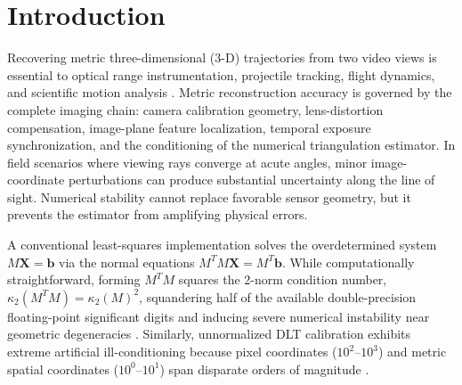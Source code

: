 \documentclass[a4paper,conference]{IEEEtran}
\newcommand{\X}{\mathbf{X}}
\begin{document}
\section{Introduction}
Recovering metric three-dimensional (3-D) trajectories from two video views is essential to optical range instrumentation, projectile tracking, flight dynamics, and scientific motion analysis \cite{hz,abdkarara}. Metric reconstruction accuracy is governed by the complete imaging chain: camera calibration geometry, lens-distortion compensation, image-plane feature localization, temporal exposure synchronization, and the conditioning of the numerical triangulation estimator. In field scenarios where viewing rays converge at acute angles, minor image-coordinate perturbations can produce substantial uncertainty along the line of sight. Numerical stability cannot replace favorable sensor geometry, but it prevents the estimator from amplifying physical errors.

A conventional least-squares implementation solves the overdetermined system $M\X = \mathbf{b}$ via the normal equations $M^T M \X = M^T \mathbf{b}$. While computationally straightforward, forming $M^T M$ squares the 2-norm condition number, $\kappa_2(M^T M) = \kappa_2(M)^2$, squandering half of the available double-precision floating-point significant digits and inducing severe numerical instability near geometric degeneracies \cite{golub}. Similarly, unnormalized DLT calibration exhibits extreme artificial ill-conditioning because pixel coordinates ($10^2$--$10^3$) and metric spatial coordinates ($10^0$--$10^1$) span disparate orders of magnitude \cite{hz}.
\end{document}
